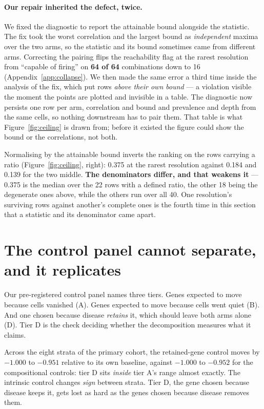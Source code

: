 \documentclass{article}
\begin{document}
\paragraph{Our repair inherited the defect, twice.} We fixed the diagnostic to
report the attainable bound alongside the statistic. The fix took the worst
correlation and the largest bound as \emph{independent} maxima over the two arms,
so the statistic and its bound sometimes came from different arms. Correcting the
pairing flips the reachability flag at the rarest resolution from ``capable of
firing'' on \textbf{64 of 64} combinations down to 16
(Appendix~\ref{app:collapse}). We then made the same error a third time inside
the analysis of the fix, which put rows
\emph{above their own bound} --- a violation visible the moment the points are
plotted and invisible in a table. The diagnostic now persists one row per arm,
correlation and bound and prevalence and depth from the same cells, so nothing
downstream has to pair them. That table is what Figure~\ref{fig:ceiling} is drawn
from; before it existed the figure could show the bound or the correlations, not
both.

Normalising by the attainable bound inverts the ranking on the rows carrying a
ratio (Figure~\ref{fig:ceiling}, right): 0.375 at the rarest resolution against
0.184 and 0.139 for the two middle. \textbf{The denominators differ, and that
weakens it} --- 0.375 is the median over the 22 rows with a defined ratio, the
other 18 being the degenerate ones above, while the others run over all 40. One
resolution's surviving rows against another's complete ones is the fourth time
in this section that a statistic and its denominator came apart.

\section{The control panel cannot separate, and it replicates}
\label{sec:controls}

Our pre-registered control panel names three tiers. Genes expected to move
because cells vanished (A). Genes expected to move because cells went quiet (B).
And one chosen because disease \emph{retains} it, which should leave both arms
alone (D). Tier D is the check deciding whether the decomposition measures what
it claims.

Across the eight strata of the primary cohort, the retained-gene control moves by
$-1.000$ to $-0.951$ relative to its own baseline, against $-1.000$ to $-0.952$
for the compositional controls: tier D sits \emph{inside} tier A's range almost
exactly. The intrinsic control changes \emph{sign} between strata. Tier D, the
gene chosen because disease keeps it, gets lost as hard as the genes chosen
because disease removes them.
\end{document}
